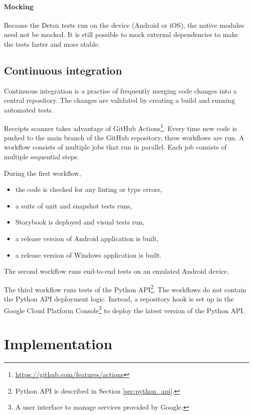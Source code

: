 \documentclass[
  digital, %
  table,   %
  oneside, %
  lof,     %
  lot,     %
]{fithesis3}
\begin{document}
\subsubsection{Mocking}
Because the Detox tests run on the device (Android or iOS), the native modules need not be mocked. It is still possible to mock external dependencies to make the tests faster and more stable.

\section{Continuous integration}
\label{sec:continuous_integration}
Continuous integration is a practise of frequently merging code changes into a central repository. The changes are validated by creating a build and running automated tests. \cite{Fowler2006Continuous}

Receipts scanner takes advantage of GitHub Actions\footnote{\url{https://github.com/features/actions}}. Every time new code is pushed to the main branch of the GitHub repository, three workflows are run. A workflow consists of multiple jobs that run in parallel. Each job consists of multiple sequential steps.

During the first workflow,
\begin{itemize}
    \item the code is checked for any linting or type errors,
    \item a suite of unit and snapshot tests runs,
    \item Storybook is deployed and visual tests run,
    \item a release version of Android application is built,
    \item a release version of Windows application is built.
\end{itemize}

The second workflow runs end-to-end tests on an emulated Android device.

The third workflow runs tests of the Python API\footnote{Python API is described in Section \ref{sec:python_api}.}. The workflows do not contain the Python API deployment logic. Instead, a repository hook is set up in the Google Cloud Platform Console\footnote{A user interface to manage services provided by Google.} to deploy the latest version of the Python API.

\chapter{Implementation}
\end{document}
